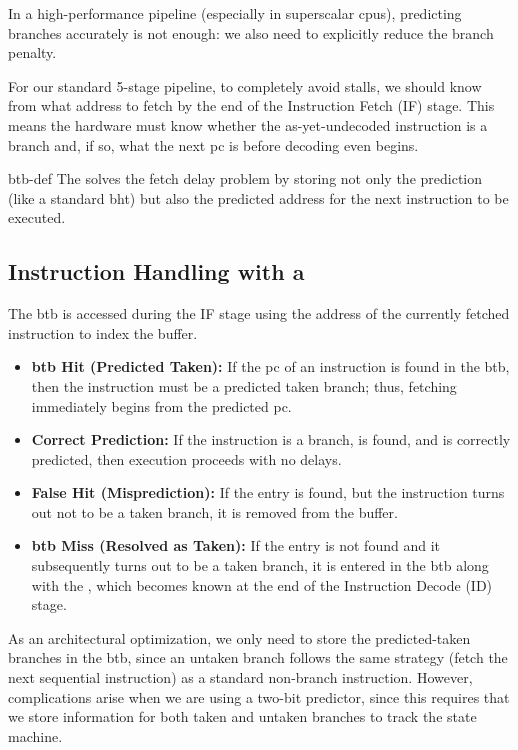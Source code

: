In a high-performance pipeline (especially in superscalar \glspl{cpu}), predicting branches accurately is not enough: we also need to explicitly reduce the branch penalty. 

For our standard 5-stage pipeline, to completely avoid stalls, we should know from what address to fetch by the end of the Instruction Fetch (IF) stage. This means the hardware must know whether the as-yet-undecoded instruction is a branch and, if so, what the next \gls{pc} is before decoding even begins.

\begin{concept}{}{btb-def}
    The  solves the fetch delay problem by storing not only the prediction (like a standard \gls{bht}) but also the predicted address for the next instruction to be executed.
\end{concept}

\subsection{Instruction Handling with a }

The \gls{btb} is accessed during the IF stage using the address of the currently fetched instruction to index the buffer. 

\begin{itemize}
    \item \textbf{\gls{btb} Hit (Predicted Taken):} If the \gls{pc} of an instruction is found in the \gls{btb}, then the instruction must be a predicted taken branch; thus, fetching immediately begins from the predicted \gls{pc}. 
    \item \textbf{Correct Prediction:} If the instruction is a branch, is found, and is correctly predicted, then execution proceeds with no delays.
    \item \textbf{False Hit (Misprediction):} If the entry is found, but the instruction turns out not to be a taken branch, it is removed from the buffer.
    \item \textbf{\gls{btb} Miss (Resolved as Taken):} If the entry is not found and it subsequently turns out to be a taken branch, it is entered in the \gls{btb} along with the , which becomes known at the end of the Instruction Decode (ID) stage.
\end{itemize}

As an architectural optimization, we only need to store the predicted-taken branches in the \gls{btb}, since an untaken branch follows the same strategy (fetch the next sequential instruction) as a standard non-branch instruction. However, complications arise when we are using a two-bit predictor, since this requires that we store information for both taken and untaken branches to track the state machine.

